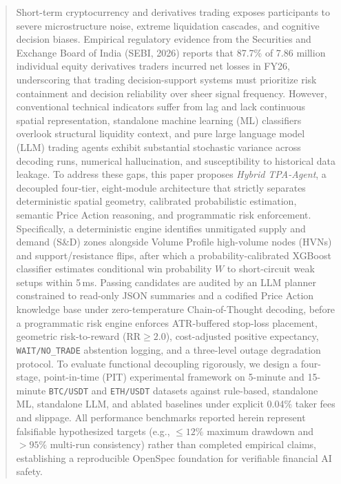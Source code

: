 \documentclass[conference]{IEEEtran}
\begin{document}
\begin{abstract}
Short-term cryptocurrency and derivatives trading exposes participants to severe microstructure noise, extreme liquidation cascades, and cognitive decision biases. Empirical regulatory evidence from the Securities and Exchange Board of India (SEBI, 2026) reports that 87.7\% of 7.86 million individual equity derivatives traders incurred net losses in FY26, underscoring that trading decision-support systems must prioritize risk containment and decision reliability over sheer signal frequency. However, conventional technical indicators suffer from lag and lack continuous spatial representation, standalone machine learning (ML) classifiers overlook structural liquidity context, and pure large language model (LLM) trading agents exhibit substantial stochastic variance across decoding runs, numerical hallucination, and susceptibility to historical data leakage. To address these gaps, this paper proposes \textit{Hybrid TPA-Agent}, a decoupled four-tier, eight-module architecture that strictly separates deterministic spatial geometry, calibrated probabilistic estimation, semantic Price Action reasoning, and programmatic risk enforcement. Specifically, a deterministic engine identifies unmitigated supply and demand (S\&D) zones alongside Volume Profile high-volume nodes (HVNs) and support/resistance flips, after which a probability-calibrated XGBoost classifier estimates conditional win probability $W$ to short-circuit weak setups within 5\,ms. Passing candidates are audited by an LLM planner constrained to read-only JSON summaries and a codified Price Action knowledge base under zero-temperature Chain-of-Thought decoding, before a programmatic risk engine enforces ATR-buffered stop-loss placement, geometric risk-to-reward ($\mathrm{RR} \ge 2.0$), cost-adjusted positive expectancy, \texttt{WAIT/NO\_TRADE} abstention logging, and a three-level outage degradation protocol. To evaluate functional decoupling rigorously, we design a four-stage, point-in-time (PIT) experimental framework on 5-minute and 15-minute \texttt{BTC/USDT} and \texttt{ETH/USDT} datasets against rule-based, standalone ML, standalone LLM, and ablated baselines under explicit 0.04\% taker fees and slippage. All performance benchmarks reported herein represent falsifiable hypothesized targets (e.g., $\le 12\%$ maximum drawdown and $>95\%$ multi-run consistency) rather than completed empirical claims, establishing a reproducible OpenSpec foundation for verifiable financial AI safety.
\end{abstract}
\end{document}
